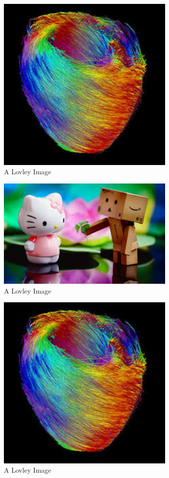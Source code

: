 \documentclass[report]{IEEEtran}
\begin{document}
\begin{figure}[h]
\centering
	\includegraphics[width = 8.75cm]{image1}
	\caption{A Lovley Image}
		
\end{figure}

\begin{figure}[h]
\centering
	\includegraphics[width = 8.75cm]{image2}
	\caption{A Lovley Image}
		
\end{figure}

\begin{figure}[h]
\centering
	\includegraphics[width = 8.75cm]{image1}
	\caption{A Lovley Image}
		
\end{figure}
\end{document}
